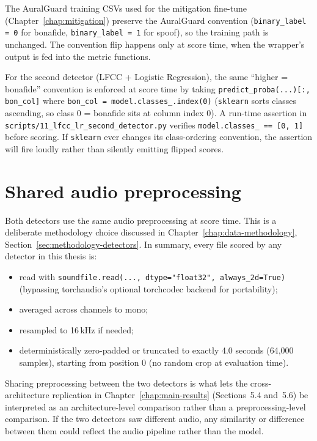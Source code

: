 The AuralGuard training CSVs used for the mitigation fine-tune
(Chapter~\ref{chap:mitigation}) preserve the AuralGuard convention
(\texttt{binary\_label = 0} for bonafide,
\texttt{binary\_label = 1} for spoof), so the training path is
unchanged. The convention flip happens only at score time, when the
wrapper's output is fed into the metric functions.

For the second detector (LFCC + Logistic Regression), the same
``higher = bonafide'' convention is enforced at score time by
taking \texttt{predict\_proba(...)[:, bon\_col]} where
\texttt{bon\_col = model.classes\_.index(0)} (\texttt{sklearn} sorts
classes ascending, so class 0 = bonafide sits at column index 0).
A run-time assertion in
\texttt{scripts/11\_lfcc\_lr\_second\_detector.py} verifies
\texttt{model.classes\_ == [0, 1]} before scoring. If \texttt{sklearn}
ever changes its class-ordering convention, the assertion will fire
loudly rather than silently emitting flipped scores.


\section{Shared audio preprocessing}
\label{sec:detector-verification-preprocessing}

Both detectors use the same audio preprocessing at score time. This
is a deliberate methodology choice discussed in
Chapter~\ref{chap:data-methodology},
Section~\ref{sec:methodology-detectors}. In summary, every file
scored by any detector in this thesis is:

\begin{itemize}
    \item read with \texttt{soundfile.read(..., dtype="float32", always\_2d=True)}
        (bypassing torchaudio's optional torchcodec
        backend for portability);
    \item averaged across channels to mono;
    \item resampled to 16\,kHz if needed;
    \item deterministically zero-padded or truncated to exactly 4.0 seconds
        (64,000 samples), starting from position 0 (no random crop at
        evaluation time).
\end{itemize}

Sharing preprocessing between the two detectors is what lets the
cross-architecture replication in Chapter~\ref{chap:main-results}
(Sections~5.4 and~5.6) be interpreted as an architecture-level
comparison rather than a preprocessing-level comparison. If the two
detectors saw different audio, any similarity or difference between
them could reflect the audio pipeline rather than the model.

